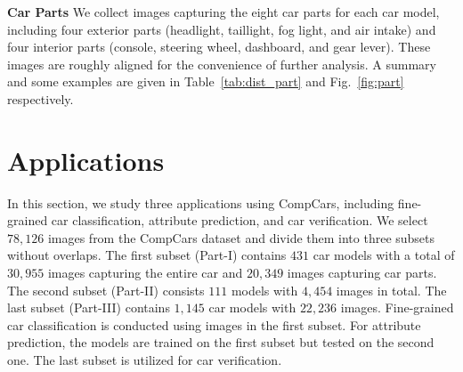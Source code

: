 \documentclass[10pt,twocolumn,letterpaper]{article}
\newcommand{\datasetName}{CompCars}
\begin{document}
\textbf{Car Parts}
We collect images capturing the eight car parts for each car model, including four exterior parts (\ie headlight, taillight, fog light, and air intake) and four interior parts (\ie console, steering wheel, dashboard, and gear lever). These images are roughly aligned for the convenience of further analysis.
%
A summary and some examples are given in Table~\ref{tab:dist_part} and Fig.~\ref{fig:part} respectively.

%


\section{Applications}\label{sec:exp}

In this section, we study three applications using \datasetName{}, including fine-grained car classification, attribute prediction, and car verification.
%
We select $78,126$ images from the \datasetName{} dataset and divide them into three subsets without overlaps. The first subset (Part-I) contains $431$ car models with a total of $30,955$ images capturing the entire car and $20,349$ images capturing car parts. The second subset (Part-II) consists $111$ models with $4,454$ images in total. The last subset (Part-III) contains $1,145$ car models with $22,236$ images.
%
Fine-grained car classification is conducted using images in the first subset. For attribute prediction, the models are trained on the first subset but tested on the second one. The last subset is utilized for car verification.
\end{document}
